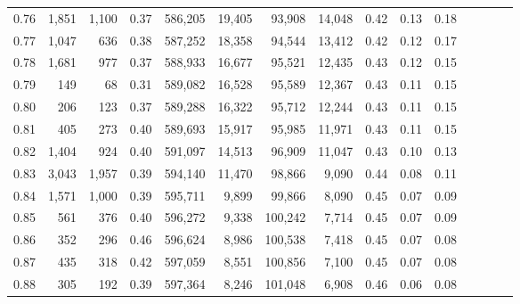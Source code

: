 \begin{tabular}{rrrcrrrrrrrrrrr}
0.76 &   1,851 &  1,100 &                                       0.37 &  586,205 &   19,405 &   93,908 &   14,048 &  0.42 &  0.13 &                         0.18 \\
0.77 &   1,047 &    636 &                                       0.38 &  587,252 &   18,358 &   94,544 &   13,412 &  0.42 &  0.12 &                         0.17 \\
0.78 &   1,681 &    977 &                                       0.37 &  588,933 &   16,677 &   95,521 &   12,435 &  0.43 &  0.12 &                         0.15 \\
0.79 &     149 &     68 &                                       0.31 &  589,082 &   16,528 &   95,589 &   12,367 &  0.43 &  0.11 &                         0.15 \\
0.80 &     206 &    123 &                                       0.37 &  589,288 &   16,322 &   95,712 &   12,244 &  0.43 &  0.11 &                         0.15 \\
0.81 &     405 &    273 &                                       0.40 &  589,693 &   15,917 &   95,985 &   11,971 &  0.43 &  0.11 &                         0.15 \\
0.82 &   1,404 &    924 &                                       0.40 &  591,097 &   14,513 &   96,909 &   11,047 &  0.43 &  0.10 &                         0.13 \\
0.83 &   3,043 &  1,957 &                                       0.39 &  594,140 &   11,470 &   98,866 &    9,090 &  0.44 &  0.08 &                         0.11 \\
0.84 &   1,571 &  1,000 &                                       0.39 &  595,711 &    9,899 &   99,866 &    8,090 &  0.45 &  0.07 &                         0.09 \\
0.85 &     561 &    376 &                                       0.40 &  596,272 &    9,338 &  100,242 &    7,714 &  0.45 &  0.07 &                         0.09 \\
0.86 &     352 &    296 &                                       0.46 &  596,624 &    8,986 &  100,538 &    7,418 &  0.45 &  0.07 &                         0.08 \\
0.87 &     435 &    318 &                                       0.42 &  597,059 &    8,551 &  100,856 &    7,100 &  0.45 &  0.07 &                         0.08 \\
0.88 &     305 &    192 &                                       0.39 &  597,364 &    8,246 &  101,048 &    6,908 &  0.46 &  0.06 &                         0.08 \\

\end{tabular}
